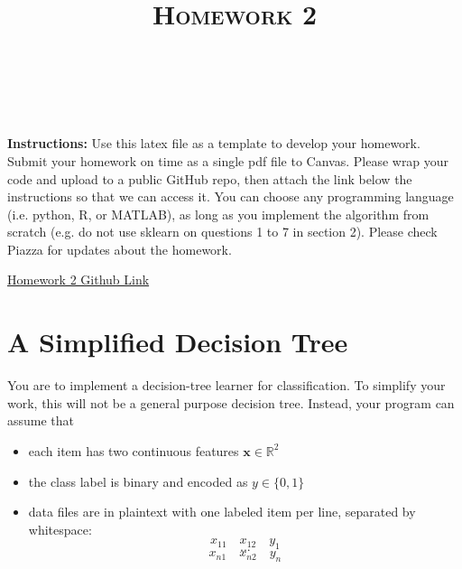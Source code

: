 \documentclass[a4paper]{article}
\title{\textsc{Homework 2}} %
\author{
\red{APOORVA KUMAR} \\
\red{908 461 5997}\\
}
\date{}
\theoremstyle{definition}
\newcommand{\RR}{\mathbb{R}}
\def\x{\mathbf x}
\newenvironment{soln}{
    \leavevmode\color{blue}\ignorespaces
}{}
\begin{document}
\maketitle 


\textbf{Instructions:} 
Use this latex file as a template to develop your homework. Submit your homework on time as a single pdf file to Canvas. Please wrap your code and upload to a public GitHub repo, then attach the link below the instructions so that we can access it. You can choose any programming language (i.e. python, R, or MATLAB), as long as you implement the algorithm from scratch (e.g. do not use sklearn on questions 1 to 7 in section 2). Please check Piazza for updates about the homework.\\

\begin{soln}
    \Large
    \href{https://github.com/cybr17crwlr/ECE-760-Machine-Learning-Assignments/tree/master/Homework%202}{Homework 2 Github Link}
\end{soln}


\section{A Simplified Decision Tree}
You are to implement a decision-tree learner for classification.
To simplify your work, this will not be a general purpose decision tree.  Instead, your program can assume that
\begin{itemize}
\item each item has two continuous features $\x \in \RR^2$
\item the class label is binary and encoded as $y \in \{0,1\}$
\item data files are in plaintext with one labeled item per line, separated by whitespace:
$$x_{11} \quad x_{12} \quad y_1$$
$$...$$
$$x_{n1} \quad x_{n2} \quad y_n$$
\end{itemize}
\end{document}
